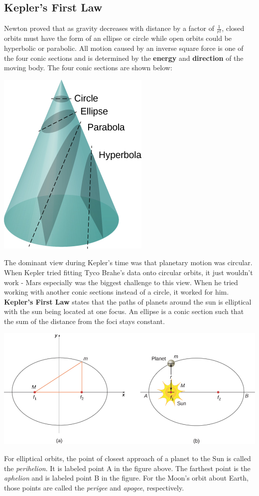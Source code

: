 \documentclass[9pt]{article}
\begin{document}
	\subsection*{Kepler's First Law}
	Newton proved that as gravity decreases with distance by a factor of $\frac{1}{r^2}$, closed orbits must have the form of an ellipse or circle while open orbits could be hyperbolic or parabolic. All motion caused by an inverse square force is one of the four conic sections and is determined by the \textbf{energy} and \textbf{direction} of the moving body. The four conic sections are shown below:
	\begin{center}
		\includegraphics[scale=0.7]{conic_sections.jpeg}
	\end{center}
	The dominant view during Kepler's time was that planetary motion was circular. When Kepler tried fitting Tyco Brahe's data onto circular orbits, it just wouldn't work - Mars especially was the biggest challenge to this view. When he tried working with another conic sections instead of a circle, it worked for him. \textbf{Kepler's First Law} states that the paths of planets around the sun is elliptical with the sun being located at one focus. An ellipse is a conic section such that the sum of the distance from the foci stays constant. 
	\begin{center}
		\includegraphics[scale=0.7]{ellipse.jpeg}
	\end{center}
	For elliptical orbits, the point of closest approach of a planet to the Sun is called the \textit{perihelion}. It is labeled point A in the figure above. The farthest point is the \textit{aphelion} and is labeled point B in the figure. For the Moon’s orbit about Earth, those points are called the \textit{perigee} and \textit{apogee}, respectively.
\end{document}
